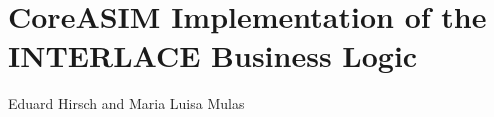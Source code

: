 \chapter{CoreASIM Implementation of the INTERLACE Business Logic}
\label{ch:CoreAsimImplementation}

\vspace{-1cm}
\begin{center}
Eduard Hirsch and Maria Luisa Mulas
\end{center}

